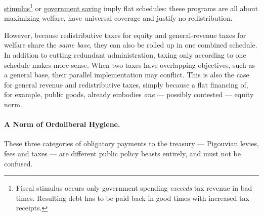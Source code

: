 \begin{description}
		
	\hyperref[sec:fiscal-stimulus]{stimulus}\footnote{
		Fiscal stimulus occurs only government spending \emph{exceeds} tax revenue in bad times. Resulting debt has to be paid back in good times with increased tax receipts.} 
	or \hyperref[sec:government-saves]{government saving} imply flat schedules: these programs are all about maximizing welfare, have universal coverage and justify no redistribution. 
	
	However, %
	 \label{sec:redistribution-and-revenue-are-one} because redistributive taxes for equity and general-revenue taxes for welfare share the \emph{same base}, they can also be rolled up in one combined schedule. In addition to cutting redundant administration, taxing only according to one schedule makes more sense. When two taxes have overlapping objectives, such as a general base, their parallel implementation may conflict. This is also the case for general revenue and redistributive taxes, simply because a flat financing of, for example, public goods, already embodies \emph{one} --- possibly contested --- equity norm. 
	
\end{description}

\paragraph[Ordoliberal Hygiene]{A Norm of Ordoliberal Hygiene.}  \label{sec:ordoliberal-hygiene} These three categories of obligatory payments to the treasury --- Pigouvian levies, fees and taxes --- are different public policy beasts entirely, and must not be confused.

%
%

